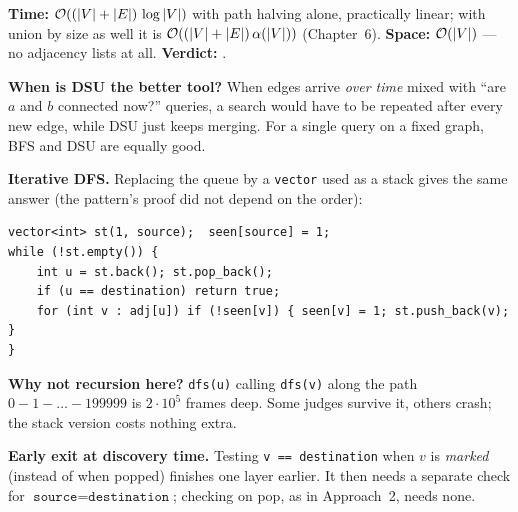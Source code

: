 \begin{alternativebox}
\begin{center}
\end{center}

\begin{complexitybox}
\textbf{Time:} $\mathcal{O}((|V|+|E|)\,\log|V|)$ with path halving alone, practically linear; with union by size as well it is $\mathcal{O}((|V|+|E|)\,\alpha(|V|))$ (Chapter~6). \textbf{Space:} $\mathcal{O}(|V|)$ --- no adjacency lists at all. \textbf{Verdict:} \ac{}.
\end{complexitybox}

\textbf{When is DSU the better tool?} When edges arrive \emph{over time} mixed with ``are $a$ and $b$ connected now?'' queries, a search would have to be repeated after every new edge, while DSU just keeps merging. For a single query on a fixed graph, BFS and DSU are equally good.
\end{alternativebox}

\begin{tricksbox}
\textbf{Iterative DFS.} Replacing the queue by a \texttt{vector} used as a stack gives the same answer (the pattern's proof did not depend on the order):
\begin{lstlisting}[style=snippet]
vector<int> st(1, source);  seen[source] = 1;
while (!st.empty()) {
    int u = st.back(); st.pop_back();
    if (u == destination) return true;
    for (int v : adj[u]) if (!seen[v]) { seen[v] = 1; st.push_back(v); }
}
\end{lstlisting}
\textbf{Why not recursion here?} \texttt{dfs(u)} calling \texttt{dfs(v)} along the path $0 - 1 - \dots - 199999$ is $2 \cdot 10^5$ frames deep. Some judges survive it, others crash; the stack version costs nothing extra.

\textbf{Early exit at discovery time.} Testing \texttt{v == destination} when $v$ is \emph{marked} (instead of when popped) finishes one layer earlier. It then needs a separate check for $\texttt{source} = \texttt{destination}$; checking on pop, as in Approach~2, needs none.
\end{tricksbox}

